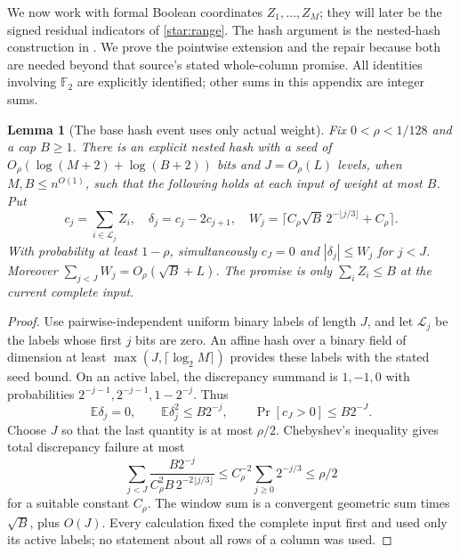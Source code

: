 \documentclass[11pt,letterpaper]{article}
\newtheorem{lemma}[theorem]{Lemma}
\theoremstyle{definition}
\theoremstyle{remark}
\newcommand{\E}{\mathbb E}
\newcommand{\F}{\mathbb F}
\begin{document}
We now work with formal Boolean coordinates $Z_1,\ldots,Z_M$; they will
later be the signed residual indicators of \cref{star:range}.
The hash argument is the nested-hash construction in
\cite[Lemmas A.1--A.3]{NagCubic}. We prove the pointwise extension and
the repair because both are needed beyond that source's stated
whole-column promise. All identities involving $\F_2$ are explicitly
identified; other sums in this appendix are integer sums.

\begin{lemma}[The base hash event uses only actual weight]
\label{list:base}
Fix $0<\rho<1/128$ and a cap $B\ge1$. There is an explicit nested hash
with a seed of $O_\rho(\log(M+2)+\log(B+2))$ bits and $J=O_\rho(L)$
levels, when $M,B\le n^{O(1)}$, such that the following holds at each
input of weight at most $B$. Put
\[
c_j=\sum_{i\in\mathcal L_j} Z_i,\quad
\delta_j=c_j-2c_{j+1},\quad
W_j=\lceil C_\rho\sqrt B\,2^{-\lfloor j/3\rfloor}+C_\rho\rceil.
\]
With probability at least $1-\rho$, simultaneously
$c_J=0$ and $|\delta_j|\le W_j$ for $j<J$.
Moreover $\sum_{j<J}W_j=O_\rho(\sqrt B+L)$.
The promise is only $\sum_i Z_i\le B$ at the current complete input.
\end{lemma}
\begin{proof}
Use pairwise-independent uniform binary labels of length $J$, and let
$\mathcal L_j$ be the labels whose first $j$ bits are zero. An affine
hash over a binary field of dimension at least $\max(J,\lceil\log_2 M\rceil)$
provides these labels with the stated seed bound. On an active label,
the discrepancy summand is $1,-1,0$ with probabilities
$2^{-j-1},2^{-j-1},1-2^{-j}$. Thus
\[
\E\delta_j=0,\qquad
\E\delta_j^2\le B2^{-j},\qquad
\Pr[c_J>0]\le B2^{-J}.
\]
Choose $J$ so that the last quantity is at most $\rho/2$.
Chebyshev's inequality gives total discrepancy failure at most
\[
\sum_{j<J}\frac{B2^{-j}}{C_\rho^2B\,2^{-2\lfloor j/3\rfloor}}
\le C_\rho^{-2}\sum_{j\ge0}2^{-j/3}
\le\rho/2
\]
for a suitable constant $C_\rho$. The window sum is a convergent
geometric sum times $\sqrt B$, plus $O(J)$. Every calculation fixed
the complete input first and used only its active labels; no statement
about all rows of a column was used.
\end{proof}
\end{document}
